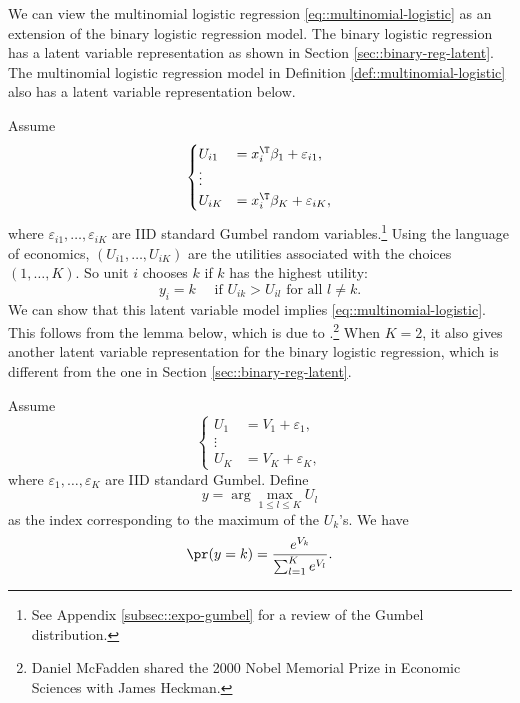 We can view the multinomial logistic regression \eqref{eq::multinomial-logistic} as an extension of the binary logistic regression model. The binary logistic regression has a latent variable representation as shown in Section \ref{sec::binary-reg-latent}. The multinomial logistic regression model in Definition \ref{def::multinomial-logistic} also has a latent variable representation below.  

Assume
\[
\begin{cases}
U_{i1} & =  x_i^{\T} \beta_1 +\varepsilon_{i1},\\
\vdots\\
U_{iK} & =x_i^{\T} \beta_K +\varepsilon_{iK},
\end{cases}
\]
where $\varepsilon_{i1},\ldots,\varepsilon_{iK}$ are IID  standard Gumbel random variables.\footnote{See Appendix \ref{subsec::expo-gumbel} for a review of the Gumbel distribution.}
Using the language of economics, $(U_{i1} , \ldots, U_{iK})$ are the utilities associated with the choices $(1,\ldots, K)$. So unit $i$ chooses $k$ if $k$ has the highest utility:
$$
y_i = k  \quad 
\text{ if } 
U_{ik} > U_{il} \text{ for all }
l\neq k.
$$ 
We can show that this latent variable model implies \eqref{eq::multinomial-logistic}. This follows from the lemma below, which is due to \citet{mcfadden1974conditional}.\footnote{Daniel McFadden shared the 2000 Nobel Memorial Prize in Economic Sciences with James Heckman.
} When $K = 2$, it also gives another latent variable representation for the binary logistic regression, which is different from the one in Section \ref{sec::binary-reg-latent}. 





\begin{lemma}
\label{lemma::mcfadden}
Assume
\[
\begin{cases}
U_{1} & =V_{1}+\varepsilon_{1},\\
\vdots\\
U_{K} & =V_{K}+\varepsilon_{K},
\end{cases}
\]
where $\varepsilon_{1},\ldots,\varepsilon_{K}$ are IID standard Gumbel. 
Define
\[
y=\arg\max_{1\leq l\leq K}U_{l}
\]
as the index corresponding to the maximum of the $U_{k}$'s. 
We have
\[
\pr(y=k)=\frac{e^{V_{k}}}{\sum_{l=1}^{K}e^{V_{l}}}.
\]
\end{lemma}


